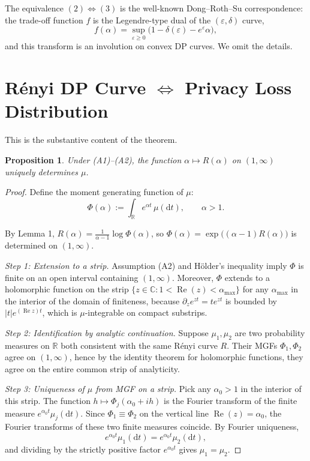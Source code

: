\documentclass[11pt]{article}
\newtheorem{proposition}{Proposition}
\begin{document}
The equivalence $(2) \Leftrightarrow (3)$ is the well-known Dong--Roth--Su correspondence: the trade-off function $f$ is the Legendre-type dual of the $(\varepsilon,\delta)$ curve,
\[
f(\alpha) = \sup_{\varepsilon \ge 0}\big(1 - \delta(\varepsilon) - e^\varepsilon \alpha\big),
\]
and this transform is an involution on convex DP curves. We omit the details.

\section{R\'enyi DP Curve $\Leftrightarrow$ Privacy Loss Distribution}

This is the substantive content of the theorem.

\begin{proposition}
Under (A1)--(A2), the function $\alpha \mapsto R(\alpha)$ on $(1,\infty)$ uniquely determines $\mu$.
\end{proposition}

\begin{proof}
Define the moment generating function of $\mu$:
\[
\Phi(\alpha) := \int_{\mathbb{R}} e^{\alpha t}\,\mu(\mathrm{d}t), \qquad \alpha > 1.
\]

By Lemma 1, $R(\alpha) = \frac{1}{\alpha-1}\log \Phi(\alpha)$, so $\Phi(\alpha) = \exp\big((\alpha-1) R(\alpha)\big)$ is determined on $(1,\infty)$.

\medskip
\noindent\textit{Step 1: Extension to a strip.} Assumption (A2) and H\"older's inequality imply $\Phi$ is finite on an open interval containing $(1,\infty)$. Moreover, $\Phi$ extends to a holomorphic function on the strip $\{z \in \mathbb{C} : 1 < \operatorname{Re}(z) < \alpha_{\max}\}$ for any $\alpha_{\max}$ in the interior of the domain of finiteness, because $\partial_z e^{zt} = t e^{zt}$ is bounded by $|t| e^{(\operatorname{Re} z) t}$, which is $\mu$-integrable on compact substrips.

\medskip
\noindent\textit{Step 2: Identification by analytic continuation.} Suppose $\mu_1, \mu_2$ are two probability measures on $\mathbb{R}$ both consistent with the same R\'enyi curve $R$. Their MGFs $\Phi_1, \Phi_2$ agree on $(1,\infty)$, hence by the identity theorem for holomorphic functions, they agree on the entire common strip of analyticity.

\medskip
\noindent\textit{Step 3: Uniqueness of $\mu$ from MGF on a strip.} Pick any $\alpha_0 > 1$ in the interior of this strip. The function $h \mapsto \Phi_j(\alpha_0 + ih)$ is the Fourier transform of the finite measure $e^{\alpha_0 t}\mu_j(\mathrm{d}t)$. Since $\Phi_1 \equiv \Phi_2$ on the vertical line $\operatorname{Re}(z) = \alpha_0$, the Fourier transforms of these two finite measures coincide. By Fourier uniqueness,
\[
e^{\alpha_0 t}\mu_1(\mathrm{d}t) = e^{\alpha_0 t}\mu_2(\mathrm{d}t),
\]
and dividing by the strictly positive factor $e^{\alpha_0 t}$ gives $\mu_1 = \mu_2$.
\end{proof}
\end{document}
